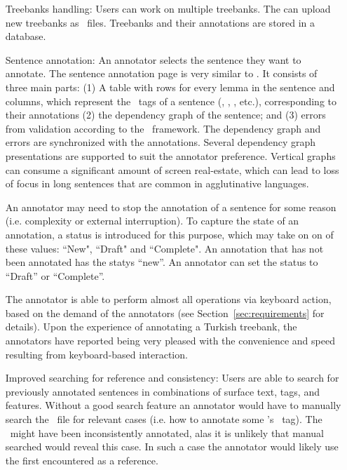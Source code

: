\begin{itemize}[before=\normalfont, font=\itshape, align=left,noitemsep,topsep=0pt,parsep=0pt,partopsep=0pt,labelwidth=5cm,align=left,itemindent=5cm]
    \item[Treebanks handling:]
        Users can work on multiple treebanks.
        The can upload new treebanks as \conllu\ files.
        Treebanks and their annotations are stored in a database.

    \item[Sentence annotation:]
    	An annotator selects the sentence they want to annotate. 
        The sentence annotation page is very similar to \boatvone.
        It consists of three main parts: (1) A table with rows for every lemma in the sentence and columns, which represent the \ud\ tags of a sentence (\form, \lemma, \deprel, etc.), corresponding to their annotations (2) the dependency graph of the sentence; and (3) errors from validation according to the \ud\ framework.
        The dependency graph and errors are synchronized with the annotations.
        Several dependency graph presentations are supported to suit the annotator preference.
        Vertical graphs can consume a significant amount of screen real-estate, which can lead to loss of focus in long sentences that are common in agglutinative languages.

        An annotator may need to stop the annotation of a sentence for some reason (i.e. complexity or external interruption).
        To capture the state of an annotation, a status is introduced for this purpose, which may take on on of these values: ``New", ``Draft" and ``Complete". 
        An annotation that has not been annotated has the statys ``new''. 
	An annotator can set the status to ``Draft'' or ``Complete''. 

        The annotator is able to perform almost all operations via keyboard action, based on the demand of the annotators (see Section~\ref{sec:requirements} for details).
        Upon the experience of annotating a Turkish treebank, the annotators have reported being very pleased with the convenience and speed resulting from keyboard-based interaction.

    \item[Improved searching for reference and consistency:]
        Users are able to search for previously annotated sentences in combinations of surface text, tags, and features. 
		Without a good search feature an annotator would have to manually search the \conllu\ file for relevant cases (i.e. how to annotate some \form's \upos\ tag).
		The \form\ might have been inconsistently annotated, alas it is unlikely that manual searched would reveal this case. 
		In such a case the annotator would likely use the first encountered as a reference. 


\end{itemize}
